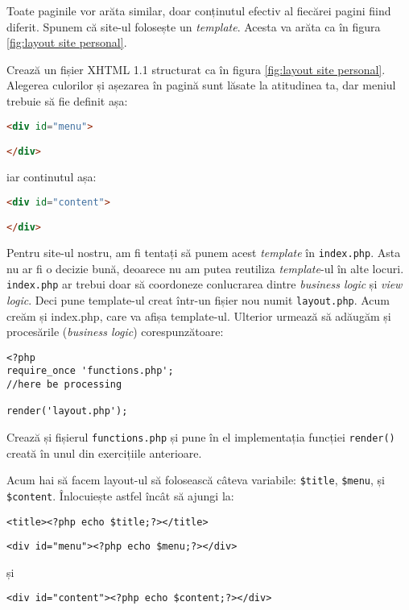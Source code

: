 Toate paginile vor
arăta similar, doar conținutul efectiv al fiecărei pagini fiind diferit. Spunem că site-ul
folosește un \textit{template}. Acesta va arăta ca în figura \ref{fig:layout site personal}.


\begin{Exercise}[title={Crează template}]
Crează un fișier XHTML 1.1 structurat ca
în figura \ref{fig:layout site personal}. Alegerea culorilor și așezarea
în pagină sunt lăsate la atitudinea ta, dar meniul trebuie să fie
definit așa:
\begin{lstlisting}[language=html]
<div id="menu">

</div>
\end{lstlisting}
iar continutul așa:
\begin{lstlisting}[language=html]
<div id="content">

</div>
\end{lstlisting}
\end{Exercise}

Pentru site-ul nostru,
am fi tentați să punem acest \textit{template} în \texttt{index.php}.
Asta nu ar fi o decizie bună, deoarece nu am putea reutiliza \textit{template}-ul
în alte locuri. \texttt{index.php} ar trebui doar să coordoneze
conlucrarea dintre \textit{business logic} și \textit{view logic}.
Deci pune template-ul creat într-un fișier nou numit \texttt{layout.php}.
Acum creăm și index.php, care va afișa template-ul. Ulterior urmează să adăugăm
și procesările (\textit{business logic}) corespunzătoare:
\begin{lstlisting}[title=index.php]
<?php
require_once 'functions.php';
//here be processing

render('layout.php');
\end{lstlisting}
Crează și fișierul \texttt{functions.php} și pune
în el implementația funcției \texttt{render()} creată
în unul din exercițiile anterioare.

Acum hai să facem layout-ul să folosească câteva variabile:
\texttt{\$title}, \texttt{\$menu}, și \texttt{\$content}.
Înlocuiește astfel încât să ajungi la:
\begin{lstlisting}[numbers=none]
<title><?php echo $title;?></title>
\end{lstlisting}
\begin{lstlisting}[numbers=none]
<div id="menu"><?php echo $menu;?></div>
\end{lstlisting}
și
\begin{lstlisting}[numbers=none]
<div id="content"><?php echo $content;?></div>
\end{lstlisting}

